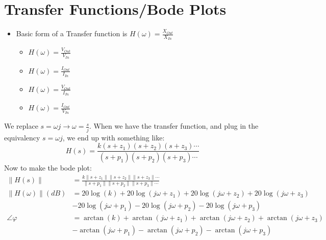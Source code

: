 \documentclass[10pt,letterpaper,final,twoside,notitlepage]{article}
\begin{document}
\section*{Transfer Functions/Bode Plots} \label{sec:Bode Plots}
	\begin{itemize}[noitemsep, nolistsep]
		\item Basic form of a Transfer function is $H \left( \omega \right) = \frac{X_{Out}}{X_{In}}$
		\begin{itemize}[noitemsep, nolistsep]
			\item $H \left( \omega \right) = \frac{V_{Out}}{V_{In}}$
			\item $H \left( \omega \right) = \frac{I_{Out}}{I_{In}}$
			\item $H \left( \omega \right) = \frac{V_{Out}}{I_{In}}$
			\item $H \left( \omega \right) = \frac{I_{Out}}{V_{In}}$
		\end{itemize}
	\end{itemize}
	We replace {\large $s = \omega j \rightarrow \omega = \frac{s}{j}$}. \newline
	When we have the transfer function, and plug in the equivalency $s = \omega j$, we end up with something like:
	\begin{equation*}
		H\left( s \right) = \frac{k \left(s + z_{1} \right) \left(s + z_{2} \right) \left(s + z_{3} \right) \cdots}{\left(s + p_{1} \right) \left(s + p_{2} \right) \left(s + p_{3} \right) \cdots}
	\end{equation*}
	Now to make the bode plot:
	\begin{align*} %
		\lVert H\left( s \right) \rVert &= \frac{k \lVert s + z_{1} \rVert \lVert s + z_{2} \rVert \lVert s + z_{3} \rVert \cdots}{\lVert s + p_{1} \rVert \lVert s + p_{2} \rVert \lVert s + p_{3} \rVert \cdots} \\
		\lVert H\left( \omega \right) \rVert (dB) &= 20\log \left( k \right) + 20\log \left( j\omega + z_{1} \right) + 20\log \left( j\omega + z_{2} \right) + 20\log \left( j\omega + z_{3} \right) \\
		&- 20\log \left( j\omega + p_{1} \right) - 20\log \left( j\omega + p_{2} \right) - 20\log \left( j\omega + p_{3} \right) \\
		\angle \varphi &= \arctan \left( k \right) + \arctan \left( j\omega + z_{1} \right) + \arctan \left( j\omega + z_{2} \right) + \arctan \left( j\omega + z_{3} \right) \\
		&-\arctan \left( j\omega + p_{1} \right) - \arctan \left( j\omega + p_{2} \right) - \arctan \left( j\omega + p_{3} \right) \\
	\end{align*}
\end{document}
